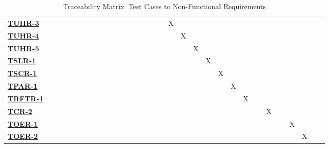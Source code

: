 \documentclass[12pt, titlepage]{article}
\begin{document}
\begin{enumerate}
\begin{table}
\begin{adjustbox}{width=1.2\textwidth}
\begin{tabular}{l|ccccccccccccccccccccccccc}
        \hyperref[TUHR-3]{\textbf{TUHR-3}}  & ~ & ~ & ~ & ~ & ~ & ~ & ~ & ~ & ~ & ~ & ~ & X & ~ & ~ & ~ & ~ & ~ & ~ & ~ & ~ & ~ & ~ & ~\\
        \hyperref[TUHR-4]{\textbf{TUHR-4}}  & ~ & ~ & ~ & ~ & ~ & ~ & ~ & ~ & ~ & ~ & ~ & ~ & X & ~ & ~ & ~ & ~ & ~ & ~ & ~ & ~ & ~ & ~\\
        \hyperref[TUHR-5]{\textbf{TUHR-5}}  & ~ & ~ & ~ & ~ & ~ & ~ & ~ & ~ & ~ & ~ & ~ & ~ & ~ & X & ~ & ~ & ~ & ~ & ~ & ~ & ~ & ~ & ~\\
        \hyperref[TSLR-1]{\textbf{TSLR-1}}  & ~ & ~ & ~ & ~ & ~ & ~ & ~ & ~ & ~ & ~ & ~ & ~ & ~ & ~ & X & ~ & ~ & ~ & ~ & ~ & ~ & ~ & ~\\
        \hyperref[TSCR-1]{\textbf{TSCR-1}}  & ~ & ~ & ~ & ~ & ~ & ~ & ~ & ~ & ~ & ~ & ~ & ~ & ~ & ~ & ~ & X & ~ & ~ & ~ & ~ & ~ & ~ & ~\\
        \hyperref[TPAR-1]{\textbf{TPAR-1}}  & ~ & ~ & ~ & ~ & ~ & ~ & ~ & ~ & ~ & ~ & ~ & ~ & ~ & ~ & ~ & ~ & X & ~ & ~ & ~ & ~ & ~ & ~\\
        \hyperref[TRFTR-1]{\textbf{TRFTR-1}}  & ~ & ~ & ~ & ~ & ~ & ~ & ~ & ~ & ~ & ~ & ~ & ~ & ~ & ~ & ~ & ~ & ~ & X & ~ & ~ & ~ & ~ & ~\\
        \hyperref[TCR-2]{\textbf{TCR-2}}  & ~ & ~ & ~ & ~ & ~ & ~ & ~ & ~ & ~ & ~ & ~ & ~ & ~ & ~ & ~ & ~ & ~ & ~ & ~ & X & ~ & ~ & ~\\
        \hyperref[TOER-1]{\textbf{TOER-1}}  & ~ & ~ & ~ & ~ & ~ & ~ & ~ & ~ & ~ & ~ & ~ & ~ & ~ & ~ & ~ & ~ & ~ & ~ & ~ & ~ & ~ & X & ~\\
        \hyperref[TOER-2]{\textbf{TOER-2}}  & ~ & ~ & ~ & ~ & ~ & ~ & ~ & ~ & ~ & ~ & ~ & ~ & ~ & ~ & ~ & ~ & ~ & ~ & ~ & ~ & ~ &  & X\\
    \end{tabular}
    \end{adjustbox}
    \caption{Traceability Matrix: Test Cases to Non-Functional Requirements}
\end{table}


\end{enumerate}
\end{document}
